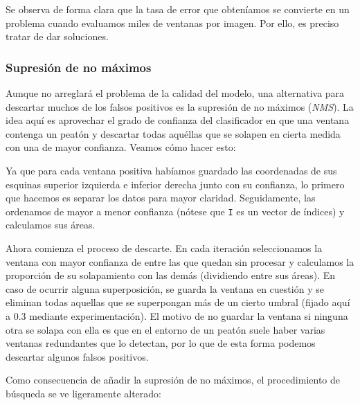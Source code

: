 \documentclass[11pt,a4paper]{article}
\begin{document}
            \par
            Se observa de forma clara que la tasa de error que obteníamos se convierte en un problema cuando evaluamos miles de ventanas por imagen. Por ello, es preciso tratar de dar soluciones.

            \subsubsection{Supresión de no máximos}

                \par
                Aunque no arreglará el problema de la calidad del modelo, una alternativa para descartar muchos de los falsos positivos es la supresión de no máximos (\textit{NMS}). La idea aquí es aprovechar el grado de confianza del clasificador en que una ventana contenga un peatón y descartar todas aquéllas que se solapen en cierta medida con una de mayor confianza. Veamos cómo hacer esto:


                \par
                Ya que para cada ventana positiva habíamos guardado las coordenadas de sus esquinas superior izquierda e inferior derecha junto con su confianza, lo primero que hacemos es separar los datos para mayor claridad. Seguidamente, las ordenamos de mayor a menor confianza (nótese que \texttt{I} es un vector de índices) y calculamos sus áreas.

                \par
                Ahora comienza el proceso de descarte. En cada iteración seleccionamos la ventana con mayor confianza de entre las que quedan sin procesar y calculamos la proporción de su solapamiento con las demás (dividiendo entre sus áreas). En caso de ocurrir alguna superposición, se guarda la ventana en cuestión y se eliminan todas aquellas que se superpongan más de un cierto umbral (fijado aquí a 0.3 mediante experimentación). El motivo de no guardar la ventana si ninguna otra se solapa con ella es que en el entorno de un peatón suele haber varias ventanas redundantes que lo detectan, por lo que de esta forma podemos descartar algunos falsos positivos.

                \par
                Como consecuencia de añadir la supresión de no máximos, el procedimiento de búsqueda se ve ligeramente alterado:
\end{document}
